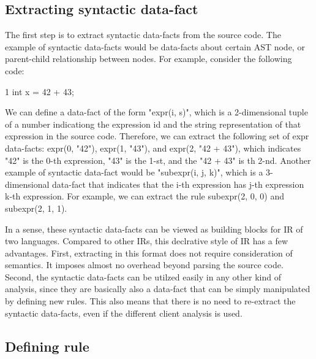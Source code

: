 \subsection{Extracting syntactic data-fact}

The first step is to extract syntactic data-facts from the source code.
The example of syntactic data-facts would be data-facts about certain
AST node, or parent-child relationship between nodes. For example, consider
the following code:

1 int x = 42 + 43;

We can define a data-fact of the form "expr(i, s)", which is a 2-dimensional
tuple of a number indicationg the expression id and the string representation
of that expression in the source code.  Therefore, we can extract the following
set of expr data-facts: expr(0, "42"), expr(1, "43"), and expr(2, "42 + 43"),
which indicates "42" is the 0-th expression, "43" is the 1-st, and the "42 +
43" is th 2-nd.  Another example of syntactic data-fact would be "subexpr(i, j,
k)", which is a 3-dimensional data-fact that indicates that the i-th expression
has j-th expression k-th expression. For example, we can extract the rule
subexpr(2, 0, 0) and subexpr(2, 1, 1).

In a sense, these syntactic data-facts can be viewed as building blocks for IR
of two languages.  Compared to other IRs, this declrative style of IR has a few
advantages. First, extracting in this format does not require consideration of
semantics.  It imposes almost no overhead beyond parsing the source code.
Second, the syntactic data-facts can be utilzed easily in any other kind of
analysis, since they are basically also a data-fact that can be simply
manipulated by defining new rules.  This also means that there is no need to
re-extract the syntactic data-facts, even if the different client analysis is
used.

\subsection{Defining rule}

